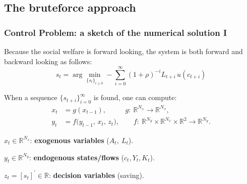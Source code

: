 \documentclass[xcolor=x11names,compress,aspectratio=169]{beamer}%
\makeatletter
\renewenvironment{itemize}{\begin{compactitemize}[<+-| alert@+>]}{\end{compactitemize}}
\makeatother
\begin{document}
\subsection{The bruteforce approach}%

\begin{frame}%
%

\frametitle{Control Problem: a sketch of the numerical solution I}%


\begin{itemize}
\item Because the social welfare is forward looking, the system is both
forward and backward looking as follows:%
\[
s_{t}=\arg\min_{\{s_{t}\}_{i\geq0}}-\sum_{i=0}^{\infty}(1+\rho)^{-i}%
L_{t+i}\,u(c_{t+i})
\]


\item When a sequence $\{s_{t+i}\}_{i=0}^{\infty}$ is found, one can compute:
\begin{align*}
x_{t}  &  =g(x_{t-1}),\qquad\text{\ \ \ \ \ \ \ \ \ }g:\ \mathbb{R}^{N_{x}%
}\rightarrow\mathbb{R}^{N_{x}},\\[0.3em]
y_{t}  &  =f\big(y_{t-1},\,x_{t},\,z_{t}\big),\qquad f:\ \mathbb{R}^{N_{y}%
}\times\mathbb{R}^{N_{x}}\times\mathbb{R}^{2}\rightarrow\mathbb{R}^{N_{y}}.
\end{align*}


\item $x_{t}\in\mathbb{R}^{N_{x}}$: \textbf{exogenous variables}
($A_{t},\ L_{t}$).

\item $y_{t}\in\mathbb{R}^{N_{y}}$: \textbf{endogenous states/flows}
($c_{t},Y_{t},K_{t}$).

\item $z_{t}=[s_{t}]^{\prime}\in\mathbb{R}$: \textbf{decision variables} (saving).
\end{itemize}

%

\transboxout
\end{frame}%
%
\end{document}
